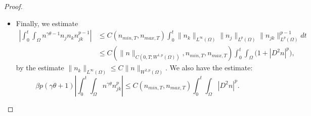 \documentclass[10pt,a4paper]{amsart}
\begin{document}
\begin{proof}
\begin{itemize}
\begin{equation*}
    \end{equation*}
    Hence, we can estimate:
    \begin{align*}
    \Bigg|\sum_{i = 1}^{d} \int_{0}^{t} \int_{\Omega} &\Big(n_{ij}n_{jk}^{p - 1}W_{ik} + n_{ik}n_{jk}^{p - 1}W_{ij} + n_{i}n_{jk}^{p - 1}W_{ijk} + n_{j}n_{jk}^{p - 1}W_{iik} + n_{k}n_{jk}^{p - 1}W_{iij}\Big)\Bigg| \\
    &\le C_{p}\left(\int_{0}^{t} \int_{\Omega} |\nabla n|^{p} |D^{3}W|^{p} + \int_{0}^{t} \left(\int_{\Omega} |D^{2}n|^{p}\right)\Big(1 +  \|W\|_{L^{\infty}(0, T; W^{2, \infty}(\Omega))}^{p}\Big)\right) \\
    &\le C_{p} \left(\int_{0}^{t} \|\nabla n\|_{L^{\infty}(\Omega)}^{p} \|W\|_{W^{3, p}(\Omega)}^{p} + \int_{0}^{t} \left(\int_{\Omega} |D^{2}n|^{p}\right) \Big(1 + \|W\|_{L^{\infty}(0, T; W^{2, \infty}(\Omega)}^{p}\Big)\right) \\
    &\le C(p, \|n\|_{C(0, T; W^{1, p}(\Omega))}, n_{min, T}, n_{max, T})\int_{0}^{t} \int_{\Omega} \Big(1 + |D^{2}n|^{p}\Big),
    \end{align*}
    since $\|\nabla n\|_{L^{\infty}} \le C_p \|n\|_{W^{2, p}(\Omega)}$ and $W \in C(0, T; W^{3, p}(\Omega)) \subset C(0, T; W^{2, \infty}(\Omega))$ with $$\|W\|_{C(0, T; W^{3, p}(\Omega))} \le C(p, n_{max, T})\|n\|_{C(0, T; W^{1, p}(\Omega))}.$$
    \item Finally, we estimate
    \begin{align*}
    \left|\int_{0}^{t} \int_{\Omega} n^{\gamma \theta - 1} n_{j}n_{k} n_{jk}^{p - 1}\right| &\le C(n_{min, T}, n_{max, T}) \int_{0}^{t} \|n_{k}\|_{L^{\infty}(\Omega)} \|n_{j}\|_{L^{p}(\Omega)} \|n_{jk}\|_{L^{p}(\Omega)}^{p - 1} dt \\
    &\le C(\|n\|_{C(0, T; W^{1, p}(\Omega))}, n_{min, T}, n_{max, T}) \int_{0}^{t} \int_{\Omega} \Big(1 + |D^{2}n|^{p}\Big),
    \end{align*}
    by the estimate $\|n_{k}\|_{L^{\infty}(\Omega)} \le C\|n\|_{W^{2, p}(\Omega)}$. We also have the estimate:
    \begin{equation*}
    \beta p (\gamma \theta + 1) \left|\int_{0}^{t} \int_{\Omega} n^{\gamma \theta} n_{jk}^{p}\right| \le C(n_{min, T}, n_{max, T}) \int_{0}^{t} \int_{\Omega} |D^{2}n|^{p}.
    \end{equation*}
\end{itemize}


\end{proof}
\end{document}

